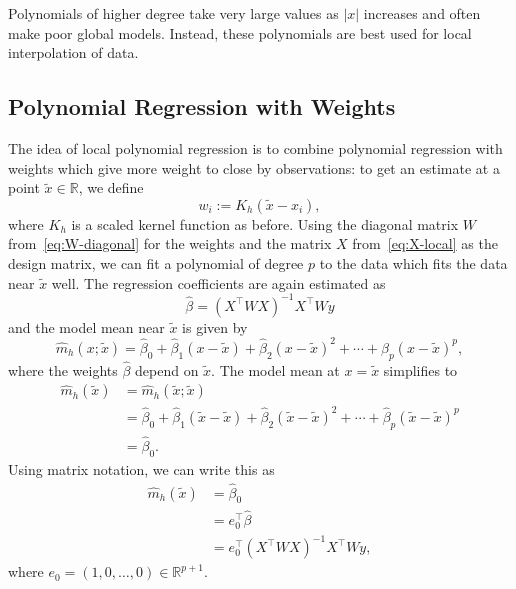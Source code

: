 \documentclass[
  a4paper,
]{article}
\theoremstyle{definition}
\theoremstyle{definition}
\theoremstyle{definition}
\theoremstyle{definition}
\theoremstyle{remark}
\begin{document}
Polynomials of higher degree take very large values as \(|x|\) increases and
often make poor global models. Instead, these polynomials are best used for
local interpolation of data.

\subsection{Polynomial Regression with Weights}\label{polynomial-regression-with-weights}

The idea of local polynomial regression is to combine polynomial regression
with weights which give more weight to close by observations: to get an
estimate at a point \(\tilde x \in \mathbb{R}\), we define
\begin{equation*}
  w_i
  := K_h(\tilde x - x_i),
\end{equation*}
where \(K_h\) is a scaled kernel function as before. Using the diagonal
matrix \(W\) from~\eqref{eq:W-diagonal} for the weights and the matrix
\(X\) from~\eqref{eq:X-local} as the design matrix, we can fit a polynomial
of degree \(p\) to the data which fits the data near \(\tilde x\) well.
The regression coefficients are again estimated as
\begin{equation*}
  \hat\beta
  = (X^\top W X)^{-1} X^\top W y
\end{equation*}
and the model mean near \(\tilde x\) is given by
\begin{equation*}
  \hat m_h(x; \tilde x)
  = \hat\beta_0 + \hat\beta_1 (x - \tilde x) + \hat\beta_2 (x - \tilde x)^2 + \cdots + \hat\beta_p (x - \tilde x)^p,
\end{equation*}
where the weights \(\hat\beta\) depend on \(\tilde x\). The model mean at
\(x = \tilde x\) simplifies to
\begin{align*}
  \hat m_h(\tilde x)
  &= \hat m_h(\tilde x; \tilde x) \\
  &= \hat\beta_0 + \hat\beta_1 (\tilde x - \tilde x) + \hat\beta_2 (\tilde x - \tilde x)^2 + \cdots + \hat\beta_p (\tilde x - \tilde x)^p \\
  &= \hat\beta_0.
\end{align*}
Using matrix notation, we can write this as
\begin{align*}
  \hat m_h(\tilde x)
  &= \hat\beta_0 \\
  &= e_0^\top \hat\beta \\
  &= e_0^\top (X^\top W X)^{-1} X^\top W y,
\end{align*}
where \(e_0 = (1, 0, \ldots, 0) \in \mathbb{R}^{p+1}\).
\end{document}
